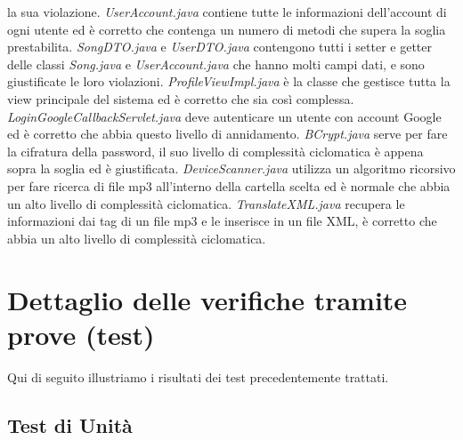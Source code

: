 la sua violazione. \emph{UserAccount.java} contiene tutte le
informazioni dell'account di ogni utente ed \`e corretto che contenga un numero
di metodi che supera la soglia prestabilita. \emph{SongDTO.java} e
\emph{UserDTO.java} contengono tutti i setter e getter delle classi
\emph{Song.java} e \emph{UserAccount.java} che hanno molti campi dati, e sono
giustificate le loro violazioni. \emph{ProfileViewImpl.java} \`e la classe che
gestisce tutta la view principale del sistema ed \`e corretto che sia cos\`i
complessa. \emph{LoginGoogleCallbackServlet.java} deve autenticare un utente con
account Google ed \`e corretto che abbia questo livello di annidamento.
\emph{BCrypt.java} serve per fare la cifratura della password, il suo livello di
complessit\`a ciclomatica \`e appena sopra la soglia ed \`e giustificata.
\emph{DeviceScanner.java} utilizza un algoritmo ricorsivo per fare ricerca di
file mp3 all'interno della cartella scelta ed \`e normale che abbia un
alto livello di complessit\`a ciclomatica. \emph{TranslateXML.java}
recupera le informazioni dai tag di un file mp3 e le inserisce in un file XML,
\`e corretto che abbia un alto livello di complessit\`a ciclomatica.

\section{Dettaglio delle verifiche tramite prove (test)}
Qui di seguito illustriamo i risultati dei test precedentemente trattati.
\subsection{Test di Unit\`a}

